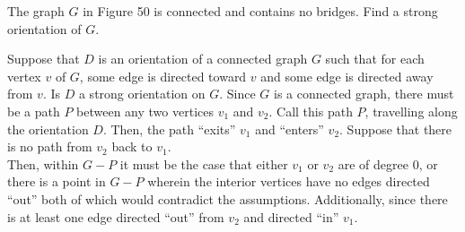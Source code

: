\documentclass[8pt]{extarticle}
\title{}
\author{}
\date{}
\begin{document}
  \begin{problem}{3}
    The graph $G$ in Figure 50 is connected and contains no bridges. Find a strong orientation of $G$.
  \end{problem}
  \begin{problem}{4}
    Suppose that $D$ is an orientation of a connected graph $G$ such that for each vertex $v$ of $G$, some edge is directed toward $v$ and some edge is directed away from $v$. Is $D$ a strong orientation on $G$.
    \tcblower
    Since $G$ is a connected graph, there must be a path $P$ between any two vertices $v_1$ and $v_2$. Call this path $P$, travelling along the orientation $D$. Then, the path ``exits'' $v_1$ and ``enters'' $v_2$. Suppose that there is no path from $v_2$ back to $v_1$.\\

    Then, within $G-P$ it must be the case that either $v_1$ or $v_2$ are of degree $0$, or there is a point in $G - P$ wherein the interior vertices have no edges directed ``out'' both of which would contradict the assumptions. Additionally, since there is at least one edge directed ``out'' from $v_2$ and directed ``in'' $v_1$.
  \end{problem}
\end{document}
